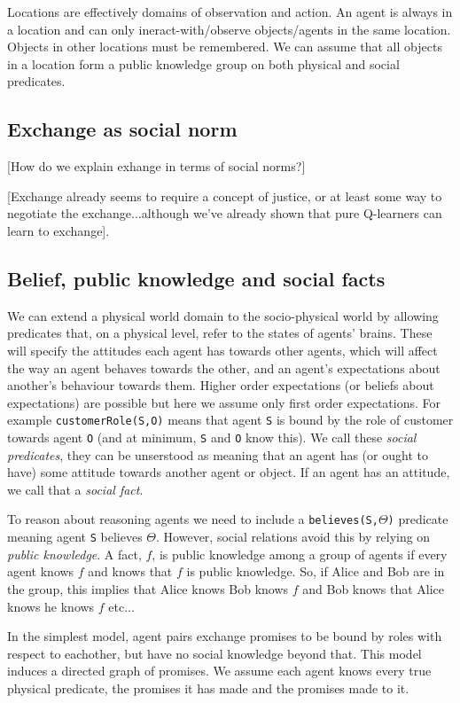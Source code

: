 \documentclass[a4paper]{article}
\begin{document}
Locations are effectively domains of observation and action. An agent is always in a location and can only ineract-with/observe objects/agents in the same location. Objects in other locations must be remembered. We can assume that all objects in a location form a public knowledge group on both physical and social predicates.

\subsection{Exchange as social norm}
[How do we explain exhange in terms of social norms?]

[Exchange already seems to require a concept of justice, or at least some way to negotiate the exchange...although we've already shown that pure Q-learners can learn to exchange]. 

\subsection{Belief, public knowledge and social facts}

We can extend a physical world domain to the socio-physical world by allowing predicates that, on a physical level, refer to the states of agents' brains. These will specify the attitudes each agent has towards other agents, which will affect the way an agent behaves towards the other, and an agent's expectations about another's behaviour towards them. Higher order expectations (or beliefs about expectations) are possible but here we assume only first order expectations. For example \texttt{customerRole(S,O)} means that agent \texttt{S} is bound by the role of customer towards agent \texttt{O} (and at minimum, \texttt{S} and \texttt{O} know this). We call these \textit{social predicates}, they can be unserstood as meaning that an agent has (or ought to have) some attitude towards another agent or object. If an agent has an attitude, we call that a \textit{social fact}.

To reason about reasoning agents we need to include a \texttt{believes(S,$\Theta$)} predicate meaning agent \texttt{S} believes $\Theta$. However, social relations avoid this by relying on \textit{public knowledge}. A fact, $f$, is public knowledge among a group of agents if every agent knows $f$ and knows that $f$ is public knowledge. So, if Alice and Bob are in the group, this implies that Alice knows Bob knows $f$ and Bob knows that Alice knows he knows $f$ etc...

In the simplest model, agent pairs exchange promises to be bound by roles with respect to eachother, but have no social knowledge beyond that. This model induces a directed graph of promises. We assume each agent knows every true physical predicate, the promises it has made and the promises made to it.
\end{document}
